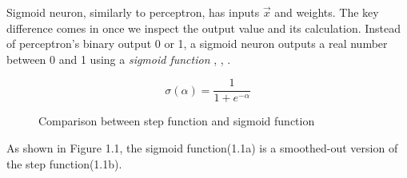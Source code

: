 Sigmoid neuron, similarly to perceptron, has inputs $\vec{x}$ and weights. The key difference comes in once we inspect the output value and its calculation. Instead of perceptron's binary output 0 or 1, a sigmoid neuron outputs a real number between 0 and 1 using a \textit{sigmoid function} \cite{nndl2015michaelnielsen}, \cite{rojas2013neural}, \cite{matous}.

\begin{equation}
    {\sigma(\alpha) = \frac{1}{1 + e^{-\alpha}}}
\end{equation}

\begin{figure}[h]
	\centering
    \qquad
    \caption{Comparison between step function and sigmoid function}
\end{figure}
As shown in Figure 1.1, the sigmoid function(1.1a) is a smoothed-out version of the step function(1.1b).
